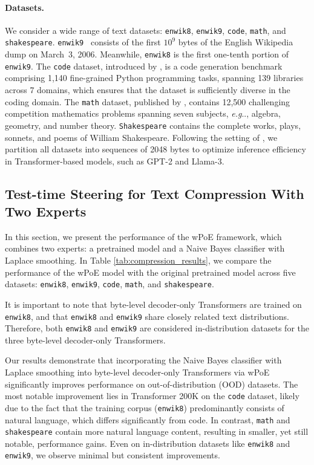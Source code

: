 \documentclass[11pt]{article}
\makeatletter
\DeclareRobustCommand\onedot{\futurelet\@let@token\@onedot}
\def\@onedot{\ifx\@let@token.\else.\null\fi\xspace}
\def\eg{\emph{e.g}\onedot} \def\Eg{\emph{E.g}\onedot}
\makeatother
\begin{document}
\paragraph{Datasets.} We consider a wide range of text datasets: \texttt{enwik8}, \texttt{enwik9}, \texttt{code}, \texttt{math}, and \texttt{shakespeare}. \texttt{enwik9}~\citep{hutter2006prize} consists of the first $10^9$ bytes 
of the English Wikipedia dump on March~3, 2006. 
Meanwhile, \texttt{enwik8} is the first one-tenth portion of \texttt{enwik9}. The \texttt{code} dataset, introduced by \citet{bigcodebench}, is a code generation benchmark comprising 1,140 fine-grained Python programming tasks, spanning 139 libraries across 7 domains, which ensures that the dataset is sufficiently diverse in the coding domain. The \texttt{math} dataset, published by \citet{mathdataset}, contains 12,500 challenging competition mathematics problems spanning seven subjects, \eg, algebra, geometry, and number theory. \texttt{Shakespeare} \cite{shakespeare2007complete} contains the complete works, plays, sonnets, and poems of William Shakespeare. Following the setting of \citet{lmic}, we partition all datasets into sequences of 2048 bytes to optimize inference efficiency in Transformer-based models, such as GPT-2 and Llama-3.

\subsection{Test-time Steering for Text Compression With Two Experts}
In this section, we present the performance of the wPoE framework, which combines two experts: a pretrained model and a Naive Bayes classifier with Laplace smoothing. 
In Table \ref{tab:compression_results}, we compare the performance of the wPoE model with the original pretrained model across five datasets: \texttt{enwik8}, \texttt{enwik9}, \texttt{code}, \texttt{math}, and \texttt{shakespeare}.

It is important to note that byte-level decoder-only Transformers are trained on \texttt{enwik8}, and that \texttt{enwik8} and \texttt{enwik9} share closely related text distributions. 
Therefore, both \texttt{enwik8} and \texttt{enwik9} are considered in-distribution datasets for the three byte-level decoder-only Transformers.

Our results demonstrate that incorporating the Naive Bayes classifier with Laplace smoothing into byte-level decoder-only Transformers via wPoE significantly improves performance on out-of-distribution (OOD) datasets. 
The most notable improvement lies in Transformer 200K on the \texttt{code} dataset, likely due to the fact that the training corpus (\texttt{enwik8}) predominantly consists of natural language, which differs significantly from code. 
In contrast, \texttt{math} and \texttt{shakespeare} contain more natural language content, resulting in smaller, yet still notable, performance gains. 
Even on in-distribution datasets like \texttt{enwik8} and \texttt{enwik9}, we observe minimal but consistent improvements.
\end{document}
